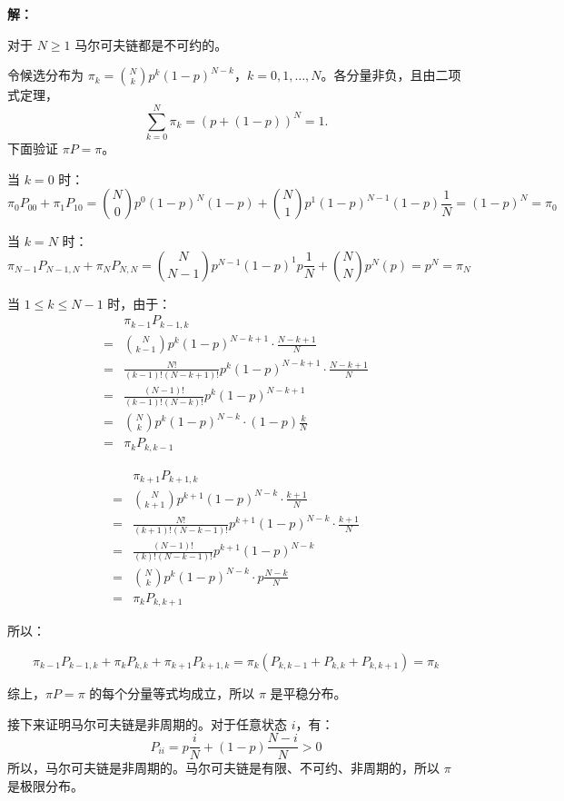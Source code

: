 \documentclass[12pt,a4paper]{article}
\begin{document}
\begin{answerbox}
\textbf{解：}

对于 $N\geq 1$ 马尔可夫链都是不可约的。

令候选分布为 $\pi_k=\binom{N}{k}p^k(1-p)^{N-k}$，$k=0,1,\ldots,N$。各分量非负，且由二项式定理，
$$
\sum_{k=0}^{N}\pi_k=(p+(1-p))^N=1.
$$
下面验证 $\pi P=\pi$。

当 $k=0$ 时：
$$
\pi_0 P_{00} + \pi_1 P_{10}= \binom{N}{0} p^0 (1-p)^{N} (1-p)+ \binom{N}{1} p^1 (1-p)^{N-1} (1-p) \frac{1}{N} = (1-p)^N = \pi_0
$$

当 $k=N$ 时：
$$
\pi_{N-1} P_{N-1,N} + \pi_N P_{N,N}= \binom{N}{N-1} p^{N-1} (1-p)^{1} p \frac{1}{N} + \binom{N}{N} p^N (p) = p^N = \pi_N
$$

当 $1\leq k \leq N-1$ 时，由于：
$$
\begin{aligned}
&\pi_{k-1}P_{k-1, k}\\
=&\binom{N}{k-1}p^k(1-p)^{N-k+1}\cdot \frac{N-k+1}{N}\\
=&\frac{N!}{(k-1)!(N-k+1)!}p^k(1-p)^{N-k+1}\cdot \frac{N-k+1}{N} \\
=&\frac{(N-1)!}{(k-1)!(N-k)!}p^k(1-p)^{N-k+1} \\
=&\binom{N}{k}p^k(1-p)^{N-k} \cdot (1-p)\frac{k}{N}\\
=&\pi_k P_{k,k-1}
\end{aligned}
$$

$$
\begin{aligned}
&\pi_{k+1}P_{k+1, k}\\
=&\binom{N}{k+1}p^{k+1}(1-p)^{N-k}\cdot \frac{k+1}{N}\\
=&\frac{N!}{(k+1)!(N-k-1)!}p^{k+1}(1-p)^{N-k}\cdot \frac{k+1}{N} \\
=&\frac{(N-1)!}{(k)!(N-k-1)!}p^{k+1}(1-p)^{N-k} \\
=&\binom{N}{k}p^k(1-p)^{N-k} \cdot p\frac{N-k}{N}\\
=&\pi_k P_{k,k+1}
\end{aligned}
$$

所以：

$$
\pi_{k-1}P_{k-1, k} + \pi_k P_{k,k} + \pi_{k+1}P_{k+1, k} = \pi_k(P_{k,k-1}+P_{k,k}+P_{k,k+1}) = \pi_k
$$

综上，$\pi P = \pi$ 的每个分量等式均成立，所以 $\pi$ 是平稳分布。

接下来证明马尔可夫链是非周期的。对于任意状态 $i$，有：
$$
P_{ii} = p\frac{i}{N} + (1-p)\frac{N-i}{N} > 0
$$
所以，马尔可夫链是非周期的。马尔可夫链是有限、不可约、非周期的，所以 $\pi$ 是极限分布。

\end{answerbox}
\end{document}
